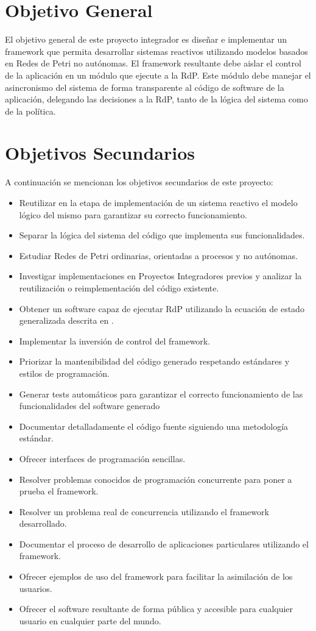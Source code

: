 \section{Objetivo General}
El objetivo general de este proyecto integrador es diseñar e implementar un
framework que permita desarrollar sistemas reactivos utilizando modelos basados
en Redes de Petri no autónomas. El framework resultante debe aislar el control
de la aplicación en un módulo que ejecute a la RdP. Este módulo debe manejar el
asincronismo del sistema de forma transparente al código de software de la
aplicación, delegando las decisiones a la RdP, tanto de la lógica del sistema
como de la política.


\section{Objetivos Secundarios}
\label{sec:objetivos_secundarios}
A continuación se mencionan los objetivos secundarios de este proyecto:
\begin{itemize}
  \item Reutilizar en la etapa de implementación de un sistema reactivo el
  modelo lógico del mismo para garantizar su correcto funcionamiento.
  \item Separar la lógica del sistema del código que implementa sus
  funcionalidades.
  \item Estudiar Redes de Petri ordinarias, orientadas a procesos y no
  autónomas.
  \item Investigar implementaciones en Proyectos Integradores previos y analizar
  la reutilización o reimplementación del código existente.
  \item Obtener un software capaz de ejecutar RdP utilizando la ecuación de
  estado generalizada descrita en \cite{Ecuacion_generalizada_LAC}.
  \item Implementar la inversión de control del framework.
  \item Priorizar la mantenibilidad del código generado respetando estándares y
  estilos de programación.
  \item Generar tests automáticos para garantizar el correcto funcionamiento de
  las funcionalidades del software generado
  \item Documentar detalladamente el código fuente siguiendo una metodología
  estándar.
  \item Ofrecer interfaces de programación sencillas.
  \item Resolver problemas conocidos de programación concurrente para poner a
  prueba el framework.
  \item Resolver un problema real de concurrencia utilizando el framework
  desarrollado.
  \item Documentar el proceso de desarrollo de aplicaciones particulares
  utilizando el framework.
  \item Ofrecer ejemplos de uso del framework para facilitar la asimilación de
  los usuarios.
  \item Ofrecer el software resultante de forma pública y accesible para
  cualquier usuario en cualquier parte del mundo.
\end{itemize}

